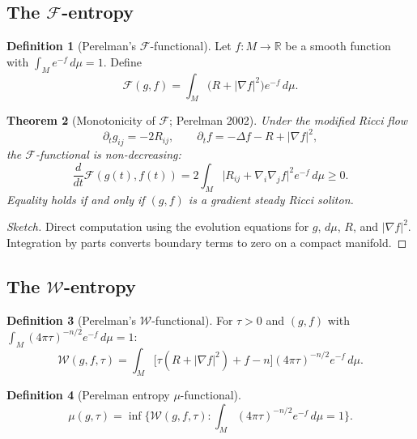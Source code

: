 \documentclass[12pt,a4paper]{amsart}
\newtheorem{theorem}{Theorem}[section]
\theoremstyle{definition}
\newtheorem{definition}[theorem]{Definition}
\theoremstyle{remark}
\newcommand{\R}{\mathbb{R}}
\begin{document}
\subsection{The $\mathcal{F}$-entropy}

\begin{definition}[Perelman's $\mathcal{F}$-functional]
Let $f: M \to \R$ be a smooth function with $\int_M e^{-f}\,d\mu = 1$.
Define
\begin{equation}
  \mathcal{F}(g,f) = \int_M \bigl(R + |\nabla f|^2\bigr) e^{-f}\,d\mu.
\end{equation}
\end{definition}

\begin{theorem}[Monotonicity of $\mathcal{F}$; Perelman 2002]
\label{thm:F-mono}
Under the \emph{modified Ricci flow}
\[
  \partial_t g_{ij} = -2 R_{ij}, \qquad
  \partial_t f = -\Delta f - R + |\nabla f|^2,
\]
the $\mathcal{F}$-functional is non-decreasing:
\begin{equation}
  \frac{d}{dt}\mathcal{F}(g(t),f(t))
  = 2\int_M \bigl|R_{ij} + \nabla_i\nabla_j f\bigr|^2 e^{-f}\,d\mu \geq 0.
\end{equation}
Equality holds if and only if $(g,f)$ is a gradient steady Ricci soliton.
\end{theorem}

\begin{proof}[Sketch]
Direct computation using the evolution equations for $g$, $d\mu$, $R$, and
$|\nabla f|^2$.  Integration by parts converts boundary terms to zero on a
compact manifold.
\end{proof}

\subsection{The $\mathcal{W}$-entropy}

\begin{definition}[Perelman's $\mathcal{W}$-functional]
For $\tau > 0$ and $(g, f)$ with $\int_M (4\pi\tau)^{-n/2}e^{-f}\,d\mu = 1$:
\begin{equation}
  \mathcal{W}(g,f,\tau)
  = \int_M \bigl[\tau(R + |\nabla f|^2) + f - n\bigr]
    (4\pi\tau)^{-n/2}e^{-f}\,d\mu.
\end{equation}
\end{definition}

\begin{definition}[Perelman entropy $\mu$-functional]
\[
  \mu(g,\tau) = \inf \bigl\{\mathcal{W}(g,f,\tau) :
    \int_M (4\pi\tau)^{-n/2}e^{-f}\,d\mu = 1 \bigr\}.
\]
\end{definition}
\end{document}
